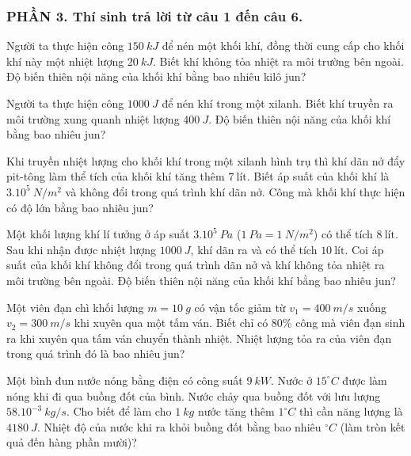 \subsubsection*{PHẦN 3. Thí sinh trả lời từ câu 1 đến câu 6.}
\setcounter{ex}{0}
\begin{ex}
Người ta thực hiện công $150\ kJ$ để nén một khối khí, đồng thời cung cấp cho khối khí này một nhiệt lượng $20\ kJ$. Biết khí không tỏa nhiệt ra môi trường bên ngoài. Độ biến thiên nội năng của khối khí bằng bao nhiêu kilô jun?
\end{ex}

\begin{ex}
Người ta thực hiện công $1000\ J$ để nén khí trong một xilanh. Biết khí truyền ra môi trường xung quanh nhiệt lượng $400\ J$. Độ biến thiên nội năng của khối khí bằng bao nhiêu jun?
\end{ex}

\begin{ex}
Khi truyền nhiệt lượng cho khối khí trong một xilanh hình trụ thì khí dãn nở đẩy pit-tông làm thể tích của khối khí tăng thêm $7\ \text{lít}$. Biết áp suất của khối khí là $3.10^{5}\ N/m^{2}$ và không đổi trong quá trình khí dãn nở. Công mà khối khí thực hiện có độ lớn bằng bao nhiêu jun?
\end{ex}

\begin{ex}
Một khối lượng khí lí tưởng ở áp suất $3.10^{5}\ Pa$ ($1\ Pa = 1\ N/m^{2}$) có thể tích $8\ \text{lít}$. Sau khi nhận được nhiệt lượng $1000\ J$, khí dãn ra và có thể tích $10\ \text{lít}$. Coi áp suất của khối khí không đổi trong quá trình dãn nở và khí không tỏa nhiệt ra môi trường bên ngoài. Độ biến thiên nội năng của khối khí bằng bao nhiêu jun?
\end{ex}

\begin{ex}
Một viên đạn chì khối lượng $m = 10\ g$ có vận tốc giảm từ $v_{1} = 400\ m/s$ xuống $v_{2} = 300\ m/s$ khi xuyên qua một tấm ván. Biết chỉ có $80\%$ công mà viên đạn sinh ra khi xuyên qua tấm ván chuyển thành nhiệt. Nhiệt lượng tỏa ra của viên đạn trong quá trình đó là bao nhiêu jun?
\end{ex}

\begin{ex}
Một bình đun nước nóng bằng điện có công suất $9\ kW$. Nước ở $15^{\circ}C$ được làm nóng khi đi qua buồng đốt của bình. Nước chảy qua buồng đốt với lưu lượng $58.10^{-3}\ kg/s$. Cho biết để làm cho $1\ kg$ nước tăng thêm $1^{\circ}C$ thì cần năng lượng là $4180\ J$. Nhiệt độ của nước khi ra khỏi buồng đốt bằng bao nhiêu $^{\circ}C$ (làm tròn kết quả đến hàng phần mười)?
\end{ex}


